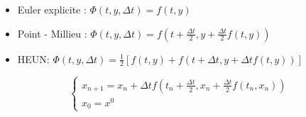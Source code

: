 \begin{eg}
    \begin{itemize}
        \item 
            Euler explicite : $\Phi(t, y, \Delta t) = f(t, y)$ 
        \item Point - Millieu : $\Phi(t, y, \Delta t) = f(t + \frac{\Delta t}{2}, y + \frac{\Delta t}{2}f(t, y))$
        \item HEUN: $\Phi(t, y, \Delta t) = \frac{1}{2}\left[ f(t, y) + f(t + \Delta t, y + \Delta t f(t, y))  \right] $
    \end{itemize}
    \begin{equation}
        \begin{cases}
            x_{n+1} = x_n + \Delta t f(t_n + \frac{\Delta t}{2}, x_n + \frac{\Delta t}{2}f(t_n, x_n))\\
            x_0 = x^0
        \end{cases}
    \end{equation}
\end{eg}

